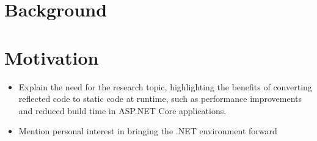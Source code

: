 \section{Background}

\section{Motivation}
\begin{itemize}
    \item Explain the need for the research topic, highlighting the benefits of converting reflected code to static code at runtime, such as performance improvements and reduced build time in ASP.NET Core applications.
    \item Mention personal interest in bringing the .NET environment forward
\end{itemize}